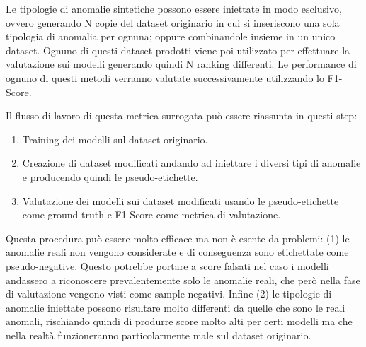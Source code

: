 Le tipologie di anomalie sintetiche possono essere iniettate in modo esclusivo, ovvero generando N copie del dataset originario in cui si inseriscono una sola tipologia di anomalia per ognuna; oppure combinandole insieme in un unico dataset. 
Ognuno di questi dataset prodotti viene poi utilizzato per effettuare la valutazione sui modelli generando quindi N ranking differenti. Le performance di ognuno di questi metodi verranno valutate successivamente utilizzando lo F1-Score.

Il flusso di lavoro di questa metrica surrogata può essere riassunta in questi step:
\begin{enumerate}
	\item Training dei modelli sul dataset originario.
	\item Creazione di dataset modificati andando ad iniettare i diversi tipi di anomalie e producendo quindi le pseudo-etichette.
	\item Valutazione dei modelli sui dataset modificati usando le pseudo-etichette come ground truth e F1 Score come metrica di valutazione.
\end{enumerate}


Questa procedura può essere molto efficace ma non è esente da problemi: (1) le anomalie reali non vengono considerate e di conseguenza sono etichettate come pseudo-negative. Questo potrebbe portare a score falsati nel caso i modelli andassero a riconoscere prevalentemente solo le anomalie reali, che però nella fase di valutazione vengono visti come sample negativi. Infine (2) le tipologie di anomalie iniettate possono risultare molto differenti da quelle che sono le reali anomali, rischiando quindi di produrre score molto alti per certi modelli ma che nella realtà funzioneranno particolarmente male sul dataset originario.

